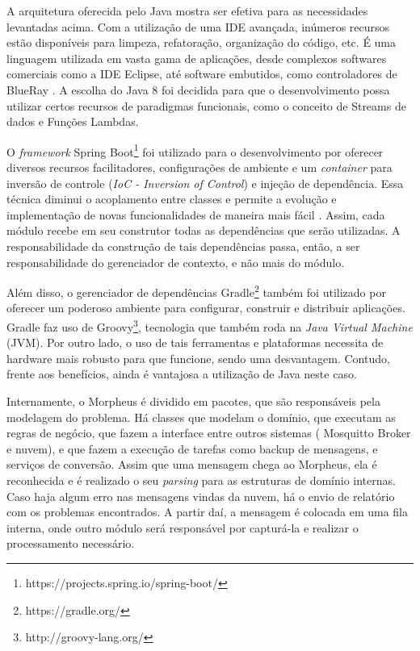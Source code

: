 A arquitetura oferecida pelo Java mostra ser efetiva para as necessidades levantadas acima. Com a utilização de uma IDE avançada, inúmeros recursos estão disponíveis para limpeza, refatoração, organização do código, etc. É uma linguagem utilizada em vasta gama de aplicações, desde complexos softwares comerciais como a IDE Eclipse, até software embutidos, como controladores de BlueRay \cite{javaBlueray}. A escolha do Java 8 foi decidida para que o desenvolvimento possa utilizar certos recursos de paradigmas funcionais, como o conceito de Streams de dados e Funções Lambdas.

O \emph{framework} Spring Boot\footnote{https://projects.spring.io/spring-boot/} foi utilizado para o desenvolvimento por oferecer diversos recursos facilitadores, configurações de ambiente e um \emph{container} para inversão de controle (\emph{IoC - Inversion of Control}) e injeção de dependência. Essa técnica diminui o acoplamento entre classes e permite a evolução e implementação de novas funcionalidades de maneira mais fácil \cite{iocFowler}. Assim, cada módulo recebe em seu construtor todas as dependências que serão utilizadas. A responsabilidade da construção de tais dependências passa, então, a ser responsabilidade do gerenciador de contexto, e não mais do módulo.

Além disso, o gerenciador de dependências Gradle\footnote{https://gradle.org/} também foi utilizado por oferecer um poderoso ambiente para configurar, construir e distribuir aplicações. Gradle faz uso de Groovy\footnote{http://groovy-lang.org/}, tecnologia que também roda na \emph{Java Virtual Machine} (JVM). Por outro lado, o uso de tais ferramentas e plataformas necessita de hardware mais robusto para que funcione, sendo uma desvantagem. Contudo, frente aos benefícios, ainda é vantajosa a utilização de Java neste caso.

Internamente, o Morpheus é dividido em pacotes, que são responsáveis pela modelagem do problema. Há classes que modelam o domínio, que executam as regras de negócio, que fazem a interface entre outros sistemas (\wmqtt{} Mosquitto Broker e nuvem), e que fazem a execução de tarefas como backup de mensagens, e serviços de conversão.
Assim que uma mensagem chega ao Morpheus, ela é reconhecida e é realizado o seu \emph{parsing} para as estruturas de domínio internas. Caso haja algum erro nas mensagens vindas da nuvem, há o envio de relatório com os problemas encontrados. A partir daí, a mensagem é colocada em uma fila interna, onde outro módulo será responsável por capturá-la e realizar o processamento necessário.


